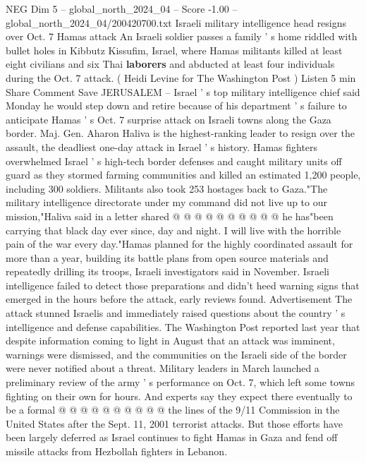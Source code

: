 \begin{textsample}{NEG Dim 5 – global\_north\_2024\_04 – Score -1.00 – global\_north\_2024\_04/200420700.txt}  \label{ex:f5_neg_166}
Israeli military intelligence head resigns over Oct. 7 Hamas attack An Israeli soldier passes a family ' s home riddled with bullet holes in Kibbutz Kissufim, Israel, where Hamas militants killed at least eight civilians and six Thai \textbf{laborers} and abducted at least four individuals during the Oct. 7 attack. ( Heidi Levine for The Washington Post ) Listen 5 min Share Comment Save JERUSALEM -- Israel ' s top military intelligence chief said Monday he would step down and retire because of his department ' s failure to anticipate Hamas ' s Oct. 7 surprise attack on Israeli towns along the Gaza border.
Maj.
Gen.
Aharon Haliva is the highest-ranking leader to resign over the assault, the deadliest one-day attack in Israel ' s history.
Hamas fighters overwhelmed Israel ' s high-tech border defenses and caught military units off guard as they stormed farming communities and killed an estimated 1,200 people, including 300 soldiers.
Militants also took 253 hostages back to Gaza."The military intelligence directorate under my command did not live up to our mission,"Haliva said in a letter shared @ @ @ @ @ @ @ @ @ @ he has"been carrying that black day ever since, day and night.
I will live with the horrible pain of the war every day."Hamas planned for the highly coordinated assault for more than a year, building its battle plans from open source materials and repeatedly drilling its troops, Israeli investigators said in November.
Israeli intelligence failed to detect those preparations and didn't heed warning signs that emerged in the hours before the attack, early reviews found.
Advertisement The attack stunned Israelis and immediately raised questions about the country ' s intelligence and defense capabilities.
The Washington Post reported last year that despite information coming to light in August that an attack was imminent, warnings were dismissed, and the communities on the Israeli side of the border were never notified about a threat.
Military leaders in March launched a preliminary review of the army ' s performance on Oct. 7, which left some towns fighting on their own for hours.
And experts say they expect there eventually to be a formal @ @ @ @ @ @ @ @ @ @ the lines of the 9/11 Commission in the United States after the Sept. 11, 2001 terrorist attacks.
But those efforts have been largely deferred as Israel continues to fight Hamas in Gaza and fend off missile attacks from Hezbollah fighters in Lebanon.

\end{textsample}
